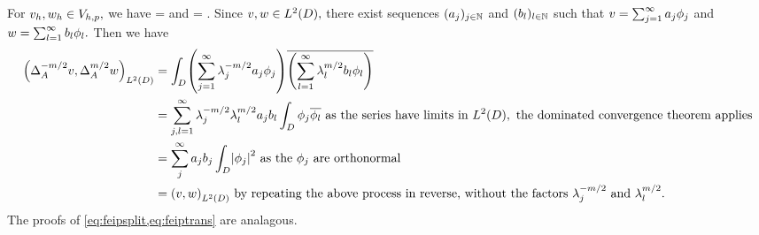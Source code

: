 

\label{lem:intoip}
For $v_{h}, w_{h} \in V_{h,p},$ we have
\beq\label{eq:feipsplit}
\IPLtD{\Deltahmmt \vh}{\Deltahmt \wh} = \IPLtD{\vh}{\wh}
\eeq
and
\beq\label{eq:feiptrans}
\IPLtD{\Deltahmt \vh}{\Deltahmt \vh} =  .
\eeq
\ele
{}
Since $v,w \in \LtD,$ there exist sequences $(a_{j})_{j \in \mathbb N}$ and $(b_{l})_{l \in \mathbb N}$ such that $v = \sum_{j=1}^\infty a_{j}\phi_{j}$ and $w = \sum_{l=1}^\infty b_{l} \phi_{l}.$ Then we have
\begin{align*}
\IPLtD{\DeltaAmmt v}{\DeltaAmt w} &= \int_D \mleft(\sum_{j=1}^\infty\lambdaj^{-m/2} \aj\phij\mright)\overline{\mleft(\sum_{l=1}^\infty \lambdal^{m/2}\bsl \phil\mright)}\\
&= \sum_{j,l=1}^\infty \lambdaj^{-m/2} \lambdal^{m/2} \aj \bsl \int_D \phij \philbar \text{ as the series have limits in } \LtD, \text{ the dominated convergence theorem applies}\\
& =\sum_{j}^\infty \aj \bsj \int_D \abs{\phij}^2 \text{ as the } \phij \text{ are orthonormal}\\
&= \IPLtD{v}{w} \text{ by repeating the above process in reverse, without the factors } \lambdaj^{-m/2} \tand \lambdal^{m/2}.
\end{align*}
The proofs of \cref{eq:feipsplit,eq:feiptrans} are analagous.
\epf

